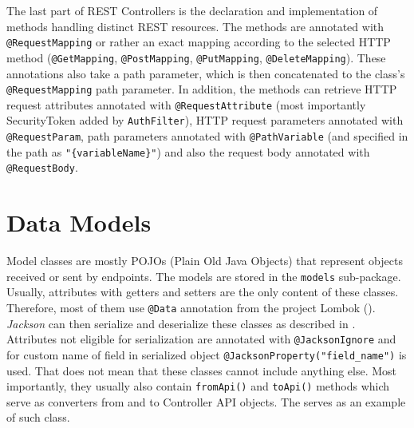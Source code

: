 The last part of REST Controllers is the declaration and implementation of methods handling distinct REST resources. The methods are annotated with \texttt{@RequestMapping} or rather an exact mapping according to the selected HTTP method (\texttt{@GetMapping}, \texttt{@PostMapping}, \texttt{@PutMapping}, \texttt{@DeleteMapping}).
These annotations also take a path parameter, which is then concatenated to the class’s \texttt{@RequestMapping} path parameter.
In addition, the methods can retrieve HTTP request attributes annotated with \texttt{@RequestAttribute} (most importantly SecurityToken added by \texttt{AuthFilter}), HTTP request parameters annotated with \texttt{@RequestParam}, path parameters annotated with \texttt{@PathVariable} (and specified in the path as \texttt{"\{variableName\}"}) and also the request body annotated with \texttt{@RequestBody}.



\section{Data Models}
Model classes are mostly POJOs (Plain Old Java Objects) that represent objects received or sent by endpoints. The models are stored in the \texttt{models} sub-package. Usually, attributes with getters and setters are the only content of these classes. Therefore, most of them use \texttt{@Data} annotation from the project Lombok ().
\emph{Jackson} can then serialize and deserialize these classes as described in . Attributes not eligible for serialization are annotated with \texttt{@JacksonIgnore} and for custom name of field in serialized object \texttt{@JacksonProperty("field\_name")} is used.
That does not mean that these classes cannot include anything else. Most importantly, they usually also contain \texttt{fromApi()} and \texttt{toApi()} methods which serve as converters from and to Controller API objects. The  serves as an example of such class.

